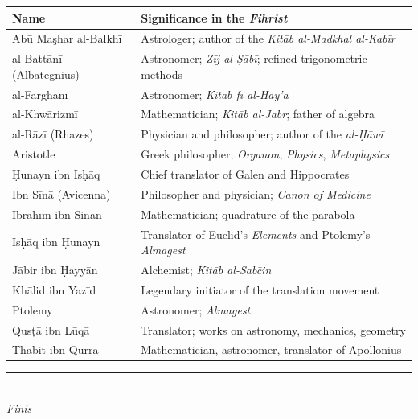 \documentclass[11pt,a4paper]{article}
\newcommand{\longline}{\noindent\rule{\textwidth}{0.4pt}}
\begin{document}
\begin{longtable}{@{}lp{8cm}@{}}
\toprule
\textbf{Name} & \textbf{Significance in the \textit{Fihrist}} \\
\midrule
\endhead
Ab\=u Ma\c{sh}ar al-Balkh\=i & Astrologer; author of the \textit{Kit\=ab al-Madkhal al-Kab\=ir} \\
al-Batt\=an\=i (Albategnius) & Astronomer; \textit{Z\=ij al-\d{S}\=ab\=i}; refined trigonometric methods \\
al-Fargh\=an\=i & Astronomer; \textit{Kit\=ab f\=i al-Hay'a} \\
al-Khw\=arizm\=i & Mathematician; \textit{Kit\=ab al-Jabr}; father of algebra \\
al-R\=az\=i (Rhazes) & Physician and philosopher; author of the \textit{al-\d{H}\=aw\=i} \\
Aristotle & Greek philosopher; \textit{Organon}, \textit{Physics}, \textit{Metaphysics} \\
\d{H}unayn ibn Is\d{h}\=aq & Chief translator of Galen and Hippocrates \\
Ibn S\=in\=a (Avicenna) & Philosopher and physician; \textit{Canon of Medicine} \\
Ibr\=ah\=im ibn Sin\=an & Mathematician; quadrature of the parabola \\
Is\d{h}\=aq ibn \d{H}unayn & Translator of Euclid's \textit{Elements} and Ptolemy's \textit{Almagest} \\
J\=abir ibn \d{H}ayy\=an & Alchemist; \textit{Kit\=ab al-Sab\={c}in} \\
Kh\=alid ibn Yaz\=id & Legendary initiator of the translation movement \\
Ptolemy & Astronomer; \textit{Almagest} \\
Qus\d{t}\=a ibn L\=uq\=a & Translator; works on astronomy, mechanics, geometry \\
Th\=abit ibn Qurra & Mathematician, astronomer, translator of Apollonius \\
\bottomrule
\end{longtable}

\vspace{1em}
\begin{center}
\longline\\[0.5em]
\textit{Finis}
\end{center}
\end{document}
